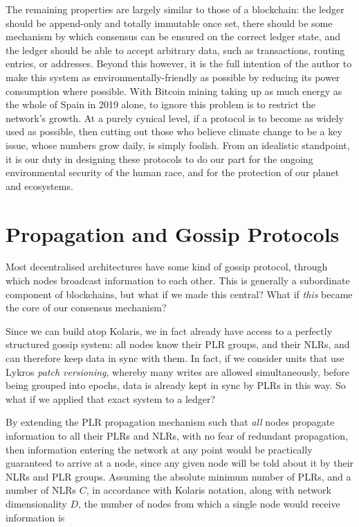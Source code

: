 \documentclass{extreport}
\begin{document}
The remaining properties are largely similar to those of a blockchain: the ledger should be append-only and totally immutable once set, there should be some mechanism by which consensus can be ensured on the correct ledger state, and the ledger should be able to accept arbitrary data, such as transactions, routing entries, or addresses. Beyond this however, it is the full intention of the author to make this system as environmentally-friendly as possible by reducing its power consumption where possible. With Bitcoin mining taking up as much energy as the whole of Spain in 2019 alone, to ignore this problem is to restrict the network's growth. At a purely cynical level, if a protocol is to become as widely used as possible, then cutting out those who believe climate change to be a key issue, whose numbers grow daily, is simply foolish. From an idealistic standpoint, it is our duty in designing these protocols to do our part for the ongoing environmental security of the human race, and for the protection of our planet and ecosystems.

\chapter{Propagation and Gossip Protocols}
\label{sec:org9c2aa3a}

Most decentralised architectures have some kind of gossip protocol, through which nodes broadcast information to each other. This is generally a subordinate component of blockchains, but what if we made this central? What if \emph{this} became the core of our consensus mechanism?

Since we can build atop Kolaris, we in fact already have access to a perfectly structured gossip system: all nodes know their PLR groups, and their NLRs, and can therefore keep data in sync with them. In fact, if we consider units that use Lykros \emph{patch versioning}, whereby many writes are allowed simultaneously, before being grouped into epochs, data is already kept in sync by PLRs in this way. So what if we applied that exact system to a ledger?

By extending the PLR propagation mechanism such that \emph{all} nodes propagate information to all their PLRs and NLRs, with no fear of redundant propagation, then information entering the network at any point would be practically guaranteed to arrive at a node, since any given node will be told about it by their NLRs and PLR groups. Assuming the absolute minimum number of PLRs, and a number of NLRs \(C\), in accordance with Kolaris notation, along with network dimensionality \(D\), the number of nodes from which a single node would receive information is
\end{document}
